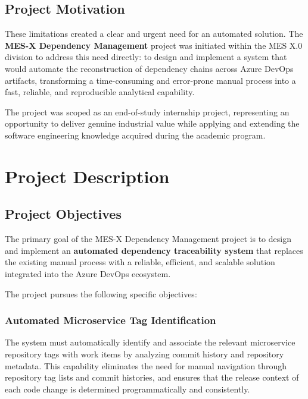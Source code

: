 \subsection{Project Motivation}
\label{subsec:motivation}

These limitations created a clear and urgent need for an automated solution.
The \textbf{MES-X Dependency Management} project was initiated within the
MES X.0 division to address this need directly: to design and implement a
system that would automate the reconstruction of dependency chains across Azure
DevOps artifacts, transforming a time-consuming and error-prone manual process
into a fast, reliable, and reproducible analytical capability.

The project was scoped as an end-of-study internship project, representing an
opportunity to deliver genuine industrial value while applying and extending
the software engineering knowledge acquired during the academic program.

\section{Project Description}
\label{sec:project-description}

\subsection{Project Objectives}
\label{subsec:objectives}

The primary goal of the MES-X Dependency Management project is to design and
implement an \textbf{automated dependency traceability system} that replaces
the existing manual process with a reliable, efficient, and scalable solution
integrated into the Azure DevOps ecosystem.

The project pursues the following specific objectives:

\subsubsection{Automated Microservice Tag Identification}

The system must automatically identify and associate the relevant microservice
repository tags with work items by analyzing commit history and repository
metadata. This capability eliminates the need for manual navigation through
repository tag lists and commit histories, and ensures that the release context
of each code change is determined programmatically and consistently.

